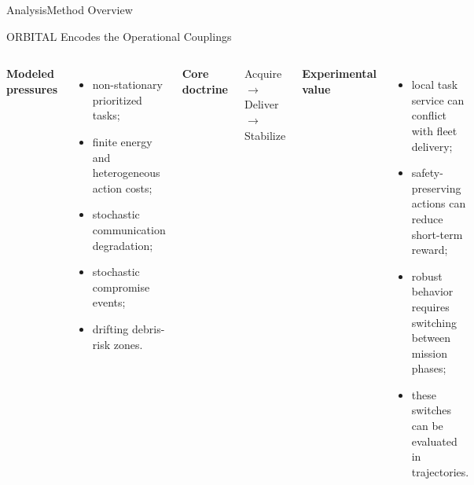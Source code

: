 \documentclass[aspectratio=169]{beamer}
\begin{document}
\begin{frame}{Analysis}{Method Overview}

\end{frame}


\begin{frame}{ORBITAL Encodes the Operational Couplings}

  \begin{columns}[T]
    \small
    \textbf{Modeled pressures}
    \begin{itemize}
      \item non-stationary prioritized tasks;
      \item finite energy and heterogeneous action costs;
      \item stochastic communication degradation;
      \item stochastic compromise events;
      \item drifting debris-risk zones.
    \end{itemize}

    \vspace{0.2cm}
    \textbf{Core doctrine}
    \begin{center}
      \large Acquire $\rightarrow$ Deliver $\rightarrow$ Stabilize
    \end{center}

    \small
    \textbf{Experimental value}
    \begin{itemize}
      \item local task service can conflict with fleet delivery;
      \item safety-preserving actions can reduce short-term reward;
      \item robust behavior requires switching between mission phases;
      \item these switches can be evaluated in trajectories.
    \end{itemize}
  \end{columns}

\end{frame}
\end{document}
